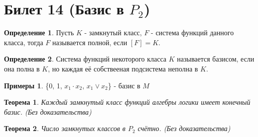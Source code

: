\documentclass[a4paper, 12pt]{article}
\theoremstyle{definition}
\newtheorem*{definition}{Определение}
\newtheorem*{example}{Примеры}
\theoremstyle{plain}
\newtheorem*{theorem}{Теорема}
\theoremstyle{remark}
\begin{document}
 \section{Билет 14 (Базис в $P_2$)}
  \begin{definition}
    Пусть $K$ - замкнутый класс, $F$ - система функций данного класса, тогда $F$ называется полной, если $[F]=K$.
  \end{definition}
  \begin{definition}
    Система функций некоторого класса $K$ называется базисом, если она полна в $K$, но каждая её собствееная подсистема неполна в $K$.
  \end{definition}
  \begin{example}
    \{0, 1, $x_1\cdot x_2$, $x_1\vee x_2$\} - базис в $M$
  \end{example}
  \begin{theorem}
    Каждый замкнутый класс функций алгебры логики имеет конечный базис. (Без доказательства)
  \end{theorem}
  \begin{theorem}
    Число замкнутых классов в $P_2$ счётно. (Без доказательства)
  \end{theorem}
\end{document}
